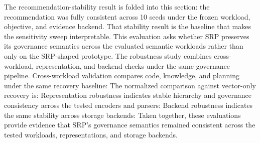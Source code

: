 {}The recommendation-stability result is folded into this section: the recommendation was fully consistent across 10 seeds under the frozen workload, objective, and evidence backend. That stability result is the baseline that makes the sensitivity sweep interpretable.\markdownRendererInterblockSeparator
{}
\markdownRendererSectionEnd \markdownRendererSectionBegin
{}\markdownRendererInterblockSeparator
{}This evaluation asks whether SRP preserves its governance semantics across the evaluated semantic workloads rather than only on the SRP-shaped prototype.\markdownRendererParagraphSeparator
{}The robustness study combines cross-workload, representation, and backend checks under the same governance pipeline.\markdownRendererParagraphSeparator
{}Cross-workload validation compares code, knowledge, and planning under the same recovery baseline:\markdownRendererInterblockSeparator
{}\markdownRendererInterblockSeparator
{}The normalized comparison against vector-only recovery is:\markdownRendererInterblockSeparator
{}\markdownRendererInterblockSeparator
{}Representation robustness indicates stable hierarchy and governance consistency across the tested encoders and parsers:\markdownRendererInterblockSeparator
{}\markdownRendererInterblockSeparator
{}Backend robustness indicates the same stability across storage backends:\markdownRendererInterblockSeparator
{}\markdownRendererInterblockSeparator
{}Taken together, these evaluations provide evidence that SRP's governance semantics remained consistent across the tested workloads, representations, and storage backends.\markdownRendererInterblockSeparator

